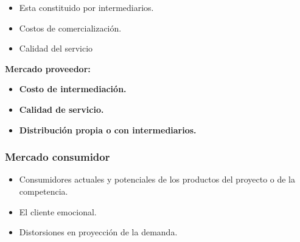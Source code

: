 \documentclass{templateNote}
\begin{document}
\begin{itemize}
    \item Esta constituido por intermediarios.
    \item Costos de comercialización.
    \item Calidad del servicio
\end{itemize}

\textbf{Mercado proveedor:}
\begin{itemize}
    \item \textbf{Costo de intermediación.}
    \item \textbf{Calidad de servicio.}
    \item \textbf{Distribución propia o con intermediarios.}
\end{itemize}

\subsubsection{Mercado consumidor}
\begin{itemize}
    \item Consumidores actuales y potenciales de los productos del proyecto o de la competencia.
    \item El cliente emocional.
    \item Distorsiones en proyección de la demanda.
\end{itemize}
\end{document}
